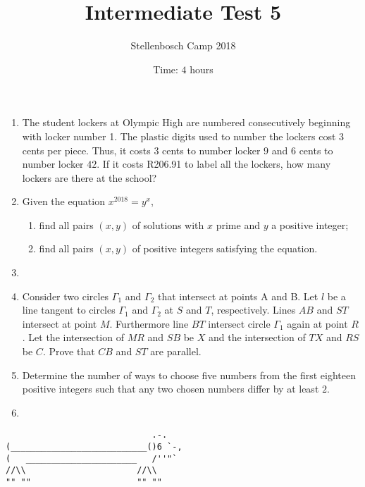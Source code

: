 \documentclass{article}
\title{Intermediate Test 5}
\author{Stellenbosch Camp 2018}
\date{Time: $4$ hours}
\begin{document}
 \maketitle

\begin{enumerate}[1.]

\item %
The student lockers at Olympic High are numbered consecutively beginning with locker number 1. The plastic digits used to number the lockers cost $3$ cents per piece. Thus, it costs $3$ cents to number locker $9$ and $6$ cents to number locker $42$. If it costs R206.91 to label all the lockers, how many lockers are there at the school?


\vspace{6pt}
\item %
Given the equation $x^{2018} = y^x$,
\begin{enumerate}
  \item find all pairs $(x,y)$ of solutions with $x$ prime and $y$ a positive integer;
  \item find all pairs $(x,y)$ of positive integers satisfying the equation.
\end{enumerate}


\vspace{6pt}
\item %


\vspace{6pt}
\item %
Consider two circles $\Gamma_1$ and $\Gamma_2$ that intersect at points A and B. Let $l$ be a line tangent to circles $\Gamma_1$ and $\Gamma_2$ at $S$ and $T$, respectively. Lines $AB$ and $ST$ intersect at point $M$. Furthermore line $BT$ intersect circle $\Gamma_1$ again at point $R$. Let the intersection of $MR$ and $SB$ be $X$ and the intersection of $TX$ and $RS$ be $C$. 
Prove that $CB$ and $ST$ are parallel.  

\vspace{6pt}
\item %
Determine the number of ways to choose five numbers from the first eighteen positive integers such that any two chosen numbers differ by at least $2$.


\vspace{6pt}
\item %


\end{enumerate}


\vfill
\centering
\begin{BVerbatim}
                             .-.
(___________________________()6 `-,
(   ______________________   /''"`
//\\                      //\\
"" ""                     "" ""
\end{BVerbatim}
\end{document}
